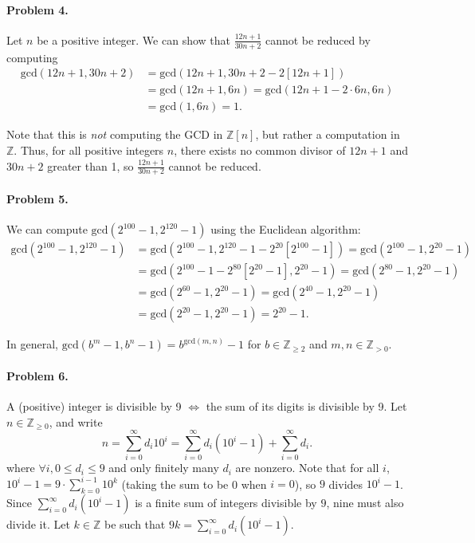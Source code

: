 \documentclass[12pt]{article}
\begin{document}
\paragraph{Problem 4.} Let $n$ be a positive integer. We can show that $\tfrac{12n+1}{30n+2}$ cannot be reduced by computing
\begin{align*}
    \mathrm{gcd}(12n+1,30n+2) &= \mathrm{gcd}(12n+1, 30n+2 - 2[12n+1]) \\ &= \mathrm{gcd}(12n+1, 6n) = \mathrm{gcd}(12n+1-2\cdot 6n, 6n) \\
    &= \mathrm{gcd}(1, 6n) = 1.
\end{align*}

Note that this is \emph{not} computing the GCD in $\mathbb Z[n]$, but rather a computation in $\mathbb Z$. Thus, for all positive integers $n$, there exists no common divisor of $12n+1$ and $30n+2$ greater than 1, so $\tfrac{12n+1}{30n+2}$ cannot be reduced.

\paragraph{Problem 5.} We can compute $\mathrm{gcd}(2^{100}-1,2^{120}-1)$ using the Euclidean algorithm:
\begin{align*}
    \mathrm{gcd}(2^{100}-1,2^{120}-1) &= \mathrm{gcd}(2^{100}-1,2^{120}-1 - 2^{20}[2^{100} - 1]) = \mathrm{gcd}(2^{100}-1, 2^{20}-1) \\
    &= \mathrm{gcd}(2^{100}-1 - 2^{80}[2^{20}-1], 2^{20}-1) = \mathrm{gcd}(2^{80}-1, 2^{20}-1) \\
    &= \mathrm{gcd}(2^{60}-1, 2^{20}-1) = \mathrm{gcd}(2^{40}-1,2^{20}-1) \\
    &= \mathrm{gcd}(2^{20}-1,2^{20}-1)= \boxed{2^{20}-1}.
\end{align*}

In general, $\mathrm{gcd}(b^m - 1, b^n - 1) = b^{\mathrm{gcd}(m, n)} - 1$ for $b \in \mathbb{Z}_{\ge 2}$ and $m,n \in \mathbb{Z}_{>0}$.


\paragraph{Problem 6.} A (positive) integer is divisible by 9 $\iff$ the sum of its digits is divisible by 9. Let $n \in \mathbb Z_{\ge 0}$, and write
\[n = \sum_{i=0}^\infty d_i 10^i = \sum_{i=0}^\infty d_i (10^i-1) + \sum_{i=0}^\infty d_i. \]
where $\forall i, 0 \le d_i \le 9$ and only finitely many $d_i$ are nonzero. Note that for all $i$, $10^i - 1 = 9\cdot \sum_{k=0}^{i-1}10^k$ (taking the sum to be 0 when $i=0$), so $9$ divides $10^i - 1$. Since $\sum_{i=0}^\infty d_i(10^i-1)$ is a finite sum of integers divisible by $9$, nine must also divide it. Let $k \in \mathbb Z$ be such that $9k = \sum_{i=0}^\infty d_i (10^i - 1)$.
\end{document}
